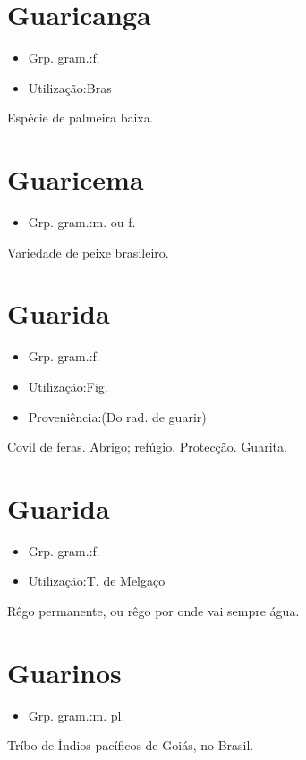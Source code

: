 \section{Guaricanga}
\begin{itemize}
\item {Grp. gram.:f.}
\end{itemize}
\begin{itemize}
\item {Utilização:Bras}
\end{itemize}
Espécie de palmeira baixa.
\section{Guaricema}
\begin{itemize}
\item {Grp. gram.:m.  ou  f.}
\end{itemize}
Variedade de peixe brasileiro.
\section{Guarida}
\begin{itemize}
\item {Grp. gram.:f.}
\end{itemize}
\begin{itemize}
\item {Utilização:Fig.}
\end{itemize}
\begin{itemize}
\item {Proveniência:(Do rad. de \textunderscore guarir\textunderscore )}
\end{itemize}
Covil de feras.
Abrigo; refúgio.
Protecção.
Guarita.
\section{Guarida}
\begin{itemize}
\item {Grp. gram.:f.}
\end{itemize}
\begin{itemize}
\item {Utilização:T. de Melgaço}
\end{itemize}
Rêgo permanente, ou rêgo por onde vai sempre água.
\section{Guarinos}
\begin{itemize}
\item {Grp. gram.:m. pl.}
\end{itemize}
Tríbo de Índios pacíficos de Goiás, no Brasil.
